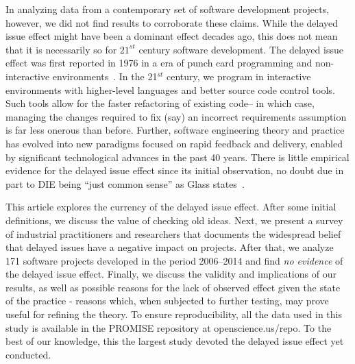 \documentclass[smallcondensed]{svjour3}
\begin{document}
In analyzing data from a contemporary set of software development projects, however, we did not find results to corroborate these claims. While the delayed issue effect might have been a dominant
effect decades ago, this does not mean that it is necessarily so for $21^{\mathit{st}}$ century
software development. 
 The delayed issue effect was first reported in 1976 in a era of punch card programming
and non-interactive environments~\cite{Boehm76}. In the 21$^\mathit{st}$ century, we  program in 
interactive environments with higher-level languages and better source code control
tools. Such tools allow for the faster refactoring of existing
code-- in which case, 
managing the changes required to fix (say) an incorrect requirements assumption
is far less    onerous    than before. Further, software engineering theory and practice has evolved into new paradigms focused on rapid feedback and delivery, enabled by significant technological advances in the past 40 years. There is little empirical evidence for the delayed issue effect since its initial observation, no doubt due in part to DIE being ``just common sense'' as Glass states~\cite{glass02}. 

This article explores the currency of the delayed issue effect.
After some initial definitions, we discuss the
value of checking old ideas. Next, we present a survey of industrial practitioners and researchers that documents the widespread belief that delayed issues have a negative impact on projects.  After that, we  analyze 171 software  projects developed in the period 2006--2014 and find  {\em no evidence} of the delayed issue effect. Finally, we discuss the validity and implications of our results, as well as possible reasons for the lack of observed effect given the state of the practice - reasons which, when subjected to further testing, may prove useful for refining the theory. To ensure reproducibility,
all the data  used in this study is available in the PROMISE
repository at openscience.us/repo. 
To the best of our knowledge,
this the largest study devoted the delayed issue effect yet conducted.
\end{document}
